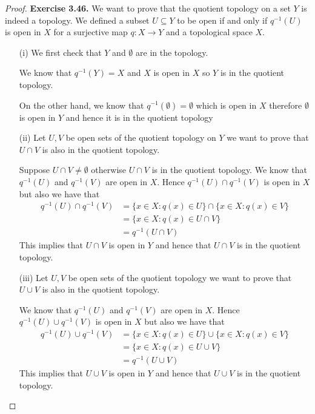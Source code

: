 \documentclass[11pt]{article}
\theoremstyle{definition}
\begin{document}
\cleardoublepage
\begin{proof}{\textbf{Exercise 3.46.}}
    We want to prove that the quotient topology on a set $Y$ is indeed
    a topology.
    We defined a subset $U \subseteq Y$ to be open if and only if
    $q^{-1}(U)$ is open in $X$ for a surjective map $q:X \to Y$ and a
    topological space $X$.
    \begin{itemize}
        \item[(i)] We first check that $Y$ and $\emptyset$ are in the topology.
        
        We know that $q^{-1}(Y) = X$ and $X$ is open in $X$ so $Y$ is in the
        quotient topology.

        On the other hand, we know that $q^{-1}(\emptyset) = \emptyset$ which 
        is open in $X$ therefore $\emptyset$ is open in $Y$ and hence it is 
        in the quotient topology 

        \item[(ii)] Let $U, V$ be open sets of the quotient topology on $Y$
        we want to prove that $U \cap V$ is also in the quotient topology.
 
        Suppose $U \cap V \neq \emptyset$ otherwise $U \cap V$ is in the
        quotient topology.
        We know that $q^{-1}(U)$ and $q^{-1}(V)$ are open in $X$.
        Hence $q^{-1}(U) \cap q^{-1}(V)$ is open in $X$ but also we have that
        \begin{align*}
            q^{-1}(U) \cap q^{-1}(V)
            &= \{x \in X : q(x) \in U\} \cap \{x \in X : q(x) \in V\}\\
            &= \{x \in X : q(x) \in U \cap V\}\\
            &= q^{-1}(U \cap V)
        \end{align*}
        This implies that $U \cap V$ is open in $Y$ and hence that $U \cap V$
        is in the quotient topology.
        
        \item[(iii)] Let $U, V$ be open sets of the quotient topology
        we want to prove that $U \cup V$ is also in the quotient
        topology.
        
        We know that $q^{-1}(U)$ and $q^{-1}(V)$ are open in $X$.
        Hence $q^{-1}(U) \cup q^{-1}(V)$ is open in $X$ but also we have that
        \begin{align*}
            q^{-1}(U) \cup q^{-1}(V)
            &= \{x \in X : q(x) \in U\} \cup \{x \in X : q(x) \in V\}\\
            &= \{x \in X : q(x) \in U \cup V\}\\
            &= q^{-1}(U \cup V)
        \end{align*}
        This implies that $U \cup V$ is open in $Y$ and hence that $U \cup V$
        is in the quotient topology.
        

\end{itemize}
\end{proof}
\end{document}
